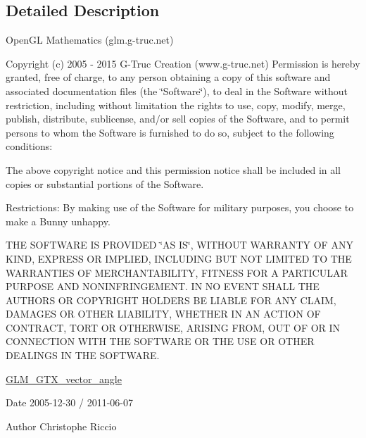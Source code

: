 \subsection{Detailed Description}
Open\+G\+L Mathematics (glm.\+g-\/truc.\+net)

Copyright (c) 2005 -\/ 2015 G-\/\+Truc Creation (www.\+g-\/truc.\+net) Permission is hereby granted, free of charge, to any person obtaining a copy of this software and associated documentation files (the \char`\"{}\+Software\char`\"{}), to deal in the Software without restriction, including without limitation the rights to use, copy, modify, merge, publish, distribute, sublicense, and/or sell copies of the Software, and to permit persons to whom the Software is furnished to do so, subject to the following conditions\+:

The above copyright notice and this permission notice shall be included in all copies or substantial portions of the Software.

Restrictions\+: By making use of the Software for military purposes, you choose to make a Bunny unhappy.

T\+H\+E S\+O\+F\+T\+W\+A\+R\+E I\+S P\+R\+O\+V\+I\+D\+E\+D \char`\"{}\+A\+S I\+S\char`\"{}, W\+I\+T\+H\+O\+U\+T W\+A\+R\+R\+A\+N\+T\+Y O\+F A\+N\+Y K\+I\+N\+D, E\+X\+P\+R\+E\+S\+S O\+R I\+M\+P\+L\+I\+E\+D, I\+N\+C\+L\+U\+D\+I\+N\+G B\+U\+T N\+O\+T L\+I\+M\+I\+T\+E\+D T\+O T\+H\+E W\+A\+R\+R\+A\+N\+T\+I\+E\+S O\+F M\+E\+R\+C\+H\+A\+N\+T\+A\+B\+I\+L\+I\+T\+Y, F\+I\+T\+N\+E\+S\+S F\+O\+R A P\+A\+R\+T\+I\+C\+U\+L\+A\+R P\+U\+R\+P\+O\+S\+E A\+N\+D N\+O\+N\+I\+N\+F\+R\+I\+N\+G\+E\+M\+E\+N\+T. I\+N N\+O E\+V\+E\+N\+T S\+H\+A\+L\+L T\+H\+E A\+U\+T\+H\+O\+R\+S O\+R C\+O\+P\+Y\+R\+I\+G\+H\+T H\+O\+L\+D\+E\+R\+S B\+E L\+I\+A\+B\+L\+E F\+O\+R A\+N\+Y C\+L\+A\+I\+M, D\+A\+M\+A\+G\+E\+S O\+R O\+T\+H\+E\+R L\+I\+A\+B\+I\+L\+I\+T\+Y, W\+H\+E\+T\+H\+E\+R I\+N A\+N A\+C\+T\+I\+O\+N O\+F C\+O\+N\+T\+R\+A\+C\+T, T\+O\+R\+T O\+R O\+T\+H\+E\+R\+W\+I\+S\+E, A\+R\+I\+S\+I\+N\+G F\+R\+O\+M, O\+U\+T O\+F O\+R I\+N C\+O\+N\+N\+E\+C\+T\+I\+O\+N W\+I\+T\+H T\+H\+E S\+O\+F\+T\+W\+A\+R\+E O\+R T\+H\+E U\+S\+E O\+R O\+T\+H\+E\+R D\+E\+A\+L\+I\+N\+G\+S I\+N T\+H\+E S\+O\+F\+T\+W\+A\+R\+E.

\hyperlink{group__gtx__vector__angle}{G\+L\+M\+\_\+\+G\+T\+X\+\_\+vector\+\_\+angle}

\begin{DoxyDate}{Date}
2005-\/12-\/30 / 2011-\/06-\/07 
\end{DoxyDate}
\begin{DoxyAuthor}{Author}
Christophe Riccio 
\end{DoxyAuthor}
